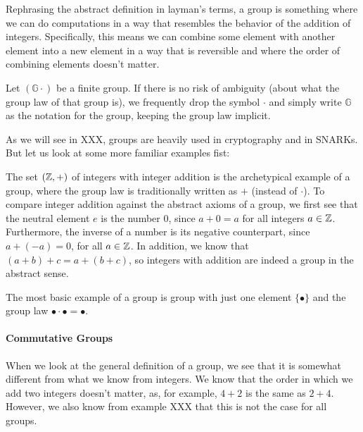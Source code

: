 Rephrasing the abstract definition in layman's terms, a group is something where we can do computations in a way that resembles the behavior of the addition of integers. Specifically, this means we can combine some element with another element into a new element in a way that is reversible and where the order of combining elements doesn't matter.
\begin{notation}
Let $(\mathbb{G}\cdot)$ be a finite group. If there is no risk of ambiguity (about what the group law of that group is), we frequently drop the symbol $\cdot$ and simply write $\mathbb{G}$ as the notation for the group, keeping the group law implicit.
\end{notation}
As we will see in XXX, groups are heavily used in cryptography and in SNARKs. But let us look at some more familiar examples fist:
\begin{example}
The set $(\mathbb{Z},+)$ of integers with integer addition is the archetypical example of a group, where the group law is traditionally written as $+$ (instead of $\cdot$). To compare integer addition against the abstract axioms of a group, we first see that the neutral element $e$ is the number $0$, since $a+0=a$ for all integers $a\in \mathbb{Z}$. Furthermore, the inverse of a number is its negative counterpart, since $a+(-a)=0$, for all $a\in\mathbb{Z}$. In addition, we know that $(a+b)+c=a+(b+c)$, so integers with addition are indeed a group in the abstract sense.
\end{example}
\begin{example}
The most basic example of a group is group with just one element $\{\bullet\}$ and the group law $\bullet\cdot \bullet=\bullet$. 
\end{example}
\paragraph{Commutative Groups} When we look at the general definition of a group, we see that it is somewhat different from what we know from integers. We know that the order in which we add two integers doesn't matter, as, for example, $4+2$ is the same as $2+4$. However, we also know from example XXX that this is not the case for all groups.

